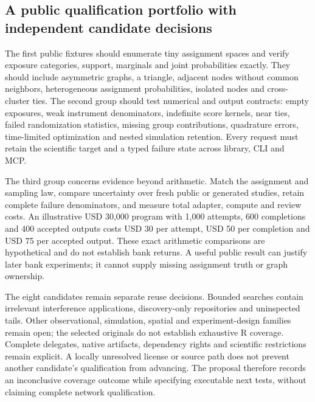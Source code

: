 \subsection{A public qualification portfolio with independent candidate decisions}

The first public fixtures should enumerate tiny assignment spaces and verify exposure categories, support, marginals and joint probabilities exactly. They should include asymmetric graphs, a triangle, adjacent nodes without common neighbors, heterogeneous assignment probabilities, isolated nodes and cross-cluster ties. The second group should test numerical and output contracts: empty exposures, weak instrument denominators, indefinite score kernels, near ties, failed randomization statistics, missing group contributions, quadrature errors, time-limited optimization and nested simulation retention. Every request must retain the scientific target and a typed failure state across library, CLI and MCP.~\citep{exec25_rnet_choice}

The third group concerns evidence beyond arithmetic. Match the assignment and sampling law, compare uncertainty over fresh public or generated studies, retain complete failure denominators, and measure total adapter, compute and review costs. An illustrative USD 30,000 program with 1,000 attempts, 600 completions and 400 accepted outputs costs USD 30 per attempt, USD 50 per completion and USD 75 per accepted output. These exact arithmetic comparisons are hypothetical and do not establish bank returns. A useful public result can justify later bank experiments; it cannot supply missing assignment truth or graph ownership.~\citep{exec25_rnet_choice}

The eight candidates remain separate reuse decisions. Bounded searches contain irrelevant interference applications, discovery-only repositories and uninspected tails. Other observational, simulation, spatial and experiment-design families remain open; the selected originals do not establish exhaustive R coverage. Complete delegates, native artifacts, dependency rights and scientific restrictions remain explicit. A locally unresolved license or source path does not prevent another candidate's qualification from advancing. The proposal therefore records an inconclusive coverage outcome while specifying executable next tests, without claiming complete network qualification.~\citep{exec25_rnet_choice}



